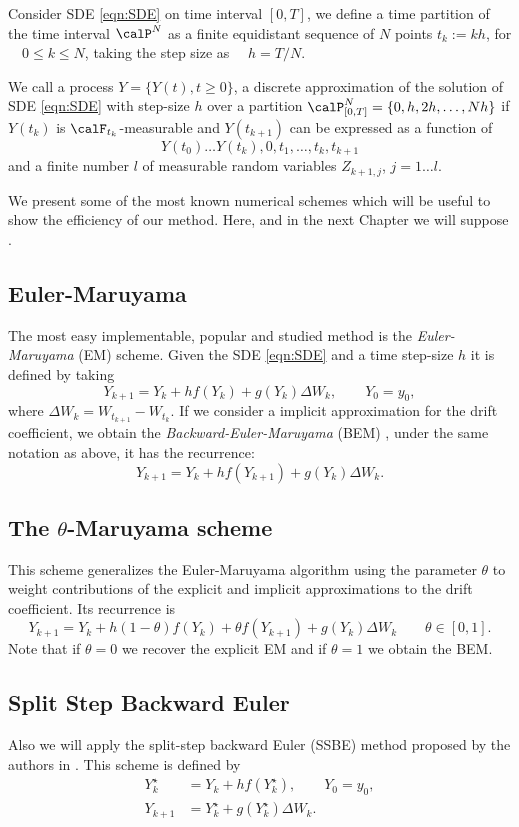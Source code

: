 	Consider SDE \eqref{eqn:SDE} on time interval $[0,T]$, we define a time
partition of the time interval $\calP^{N}$ as a finite equidistant sequence of $N$ points 
$t_k:=kh$, for $\quad 0\leq k\leq N$, taking the step size as $\quad h =T/N$.
\begin{definition}\label{dfn:ATD}
	We call a process $Y=\{Y(t),t\geq 0 \}$, a discrete approximation of the solution of SDE
	\eqref{eqn:SDE} with step-size $h$ over a partition 
	$\calP_{[0,T]}^N =\{0, h, 2h, \ldots, N h\} $ if $Y(t_k)$ is $\calF_{t_{k}}$-measurable and
	$Y(t_{k+1})$ can be expressed as a function of 
	$$Y(t_0)\ldots Y(t_k), 0,t_1, \ldots, t_k, t_{k+1}$$
	and a finite number $l$ of measurable random variables $Z_{k+1,j}$, $j=1\ldots l$.
\end{definition}
%
	We present some of the most known numerical  schemes which will be useful 
to show the efficiency of our method. Here, and in the next Chapter we will suppose 
.
\subsection*{Euler-Maruyama}
	The most easy implementable, popular and studied method is the \emph{Euler-Maruyama} (EM) scheme. Given the SDE 
	\eqref{eqn:SDE} and a 
	time step-size $h$ it is defined by taking  
	\begin{equation}\label{eqn:EulerMaruyama}
		Y_{k+1}= Y_k + h f(Y_k) + g(Y_k)\Delta W_k, \qquad Y_0=y_0,
	\end{equation}
	where $\Delta W_k =W_{t_{k+1}}-W_{t_k}$. 
	If we consider a implicit approximation for the drift coefficient, we obtain  the \emph{Backward-Euler-Maruyama}
	(BEM) \cite{Mao2013}, under the same notation as above, it has the recurrence:
	\begin{equation}\label{eqn:BackwardEM}
		Y_{k+1} = Y_k + h f(Y_{k+1}) + g(Y_k)\Delta W_k.
	\end{equation}
\subsection*{The $\theta$-Maruyama scheme}
		This scheme generalizes the Euler-Maruyama algorithm using the parameter $\theta$ 
	to weight contributions of the explicit and implicit approximations to the drift coefficient.  Its  recurrence 
	is  
	\begin{equation}\label{eqn:ThetaEM}
		Y_{k+1} = Y_k + h(1-\theta)f(Y_{k}) + 
		\theta f(Y_{k+1}) +
		g(Y_k)\Delta W_k \qquad \theta \in [0,1].
	\end{equation}
	Note that if $\theta = 0$ we recover the explicit EM and if $\theta = 1$ we obtain the BEM.
\subsection*{Split Step Backward Euler}
	Also we will apply the split-step backward Euler (SSBE) method proposed by the authors in \cite{Higham2002b}. 
	This scheme is defined by  
	\begin{align}
		Y_k^{\star} &= Y_k + hf(Y^{\star}_k), \qquad Y_0 = y_0,
		\label{eqn:SSEM1}\\
		Y_{k+1}	&= Y_k^{\star} + g(Y_k^{\star})\Delta W_k \label{eqn:SSEM2}. 
	\end{align}
